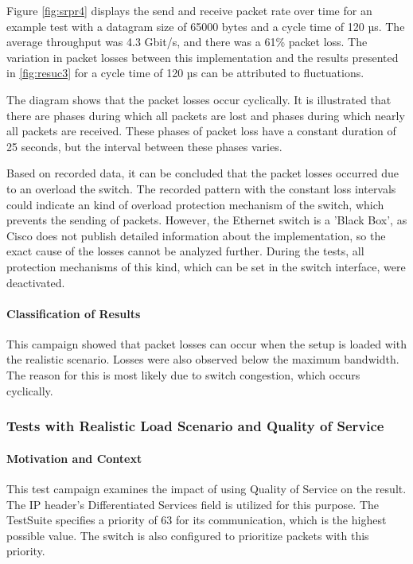 Figure \ref{fig:srpr4} displays the send and receive packet rate over time for an example test with a datagram size of 65000 bytes and a cycle time of 120 µs. The average throughput was 4.3 Gbit/s, and there was a 61\% packet loss. The variation in packet losses between this implementation and the results presented in \ref{fig:resuc3} for a cycle time of 120 µs can be attributed to fluctuations.

The diagram shows that the packet losses occur cyclically. It is illustrated that there are phases during which all packets are lost and phases during which nearly all packets are received. These phases of packet loss have a constant duration of 25 seconds, but the interval between these phases varies.

Based on recorded data, it can be concluded that the packet losses occurred due to an overload the switch. The recorded pattern with the constant loss intervals could indicate an kind of overload protection mechanism of the switch, which prevents the sending of packets. However, the Ethernet switch is a 'Black Box', as Cisco does not publish detailed information about the implementation, so the exact cause of the losses cannot be analyzed further. During the tests, all protection mechanisms of this kind, which can be set in the switch interface, were deactivated.

\paragraph{Classification of Results}
This campaign showed that packet losses can occur when the setup is loaded with the realistic scenario. Losses were also observed below the maximum bandwidth. The reason for this is most likely due to switch congestion, which occurs cyclically.

\subsubsection{Tests with Realistic Load Scenario and Quality of Service}
\paragraph{Motivation and Context}
This test campaign examines the impact of using Quality of Service on the result. The IP header's Differentiated Services field is utilized for this purpose. The TestSuite specifies a priority of 63 for its communication, which is the highest possible value. The switch is also configured to prioritize packets with this priority.

